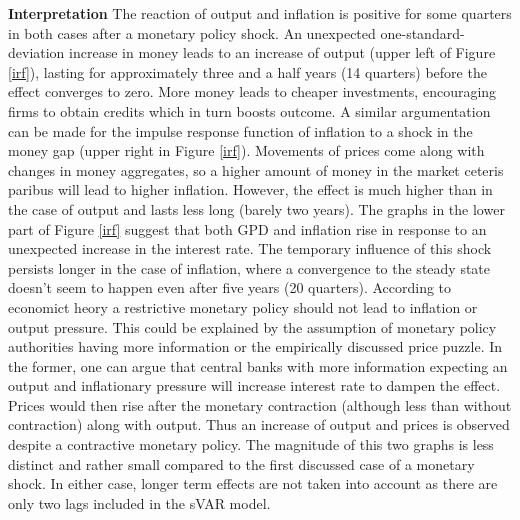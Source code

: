 \documentclass[11pt,a4paper]{report}
\begin{document}
\noindent \textbf{Interpretation}
\newline
The reaction of output and inflation is positive for some quarters in both cases after a monetary policy shock. An unexpected one-standard-deviation increase in money leads to an increase of output (upper left of Figure \ref{irf}), lasting for approximately three and a half years (14 quarters) before the effect converges to zero. More money leads to cheaper investments, encouraging firms to obtain credits which in turn boosts outcome. A similar argumentation can be made for the impulse response function of inflation to a shock in the money gap (upper right in Figure \ref{irf}).  Movements of prices come along with changes in money aggregates, so a higher amount of money in the market ceteris paribus will lead to higher inflation. However, the effect is much higher than in the case of output and lasts less long (barely two years). The graphs in the lower part of Figure \ref{irf} suggest that both GPD and inflation rise in response to an unexpected increase in the interest rate. The temporary influence of this shock persists longer in the case of inflation, where a convergence to the steady state doesn't seem to happen even after five years (20 quarters). According to economict heory  a  restrictive  monetary  policy  should  not  lead  to  inflation  or  output  pressure. This could be explained by the assumption of monetary policy authorities having more information or the empirically discussed price puzzle. In the former, one can argue that central banks with more information expecting an output and inflationary pressure will increase interest rate to dampen the effect. Prices would then rise after the monetary contraction (although less than without contraction) along with output. Thus an increase of output and prices is observed despite a contractive monetary policy. The magnitude of this two graphs is less distinct and rather small compared to the first discussed case of a monetary shock. In either case, longer term effects are not taken into account as there are only two lags included in the sVAR model.
\end{document}
